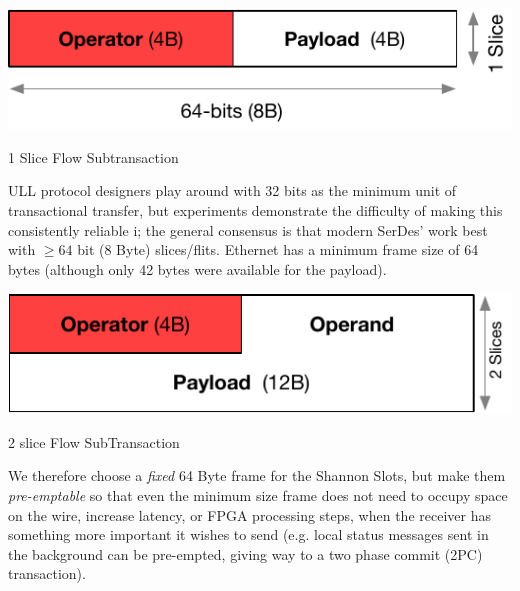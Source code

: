 \documentclass[../HFT-main.tex]{subfiles}
\begin{document}
\begin{marginfigure}
  \includegraphics[width=\linewidth]{../figures/1-slice.pdf}
  \caption{1  Slice Flow Subtransaction}

\end{marginfigure}

ULL protocol designers play around with 32 bits as the minimum unit of transactional transfer, but experiments demonstrate the difficulty of making this consistently reliable i; the general consensus is that modern SerDes' work best with $\ge 64$ bit (8 Byte) slices/flits.
Ethernet  has a minimum frame size of 64 bytes  (although only 42 bytes were available for the payload).

\begin{marginfigure}
    \includegraphics[width=\linewidth]{../figures/2-slice-operator.pdf}
  \caption{2 slice  Flow SubTransaction}%
  \vspace{12pt}
\end{marginfigure}

We therefore choose a \emph{fixed} 64 Byte frame for the Shannon Slots, but make them \emph{pre-emptable} so that even the minimum size frame does not need to occupy space on the wire, increase latency, or FPGA processing steps, when the receiver has something more important it wishes to send (e.g. local status messages sent in the background can be pre-empted, giving way to a two phase commit (2PC) transaction).
\end{document}
